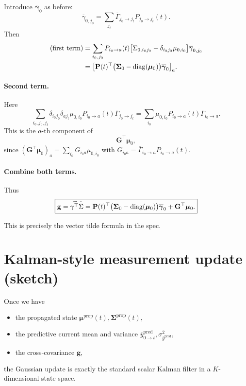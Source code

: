 \documentclass[11pt]{article}
\begin{document}
Introduce \(\overline{\boldsymbol{\gamma}}_0\) as before:
\[
  \overline{\gamma}_{0,j_0}
  =
  \sum_{j_t}
  \overline{\Gamma}_{j_0\to j_t}
  P_{j_0\to j_t}(t).
\]
Then
\begin{align*}
  \text{(first term)}
  &=
  \sum_{i_0,j_0}
  P_{i_0\to a}(t)
  \bigl[
    \Sigma_{0,i_0 j_0}
    - \delta_{i_0 j_0}\mu_{0,i_0}
  \bigr]
  \overline{\gamma}_{0,j_0}
  \\
  &=
  \bigl[
    \mathbf{P}(t)^\top
    \bigl(\boldsymbol{\Sigma}_0-\operatorname{diag}(\boldsymbol{\mu}_0)\bigr)
    \overline{\boldsymbol{\gamma}}_0
  \bigr]_a.
\end{align*}

\paragraph{Second term.}

Here
\[
  \sum_{i_0,j_0,j_t}
  \delta_{i_0 j_0}
  \delta_{a j_t}
  \mu_{0,i_0}
  P_{i_0\to a}(t)
  \overline{\Gamma}_{j_0\to j_t}
  =
  \sum_{i_0}
  \mu_{0,i_0}
  P_{i_0\to a}(t)
  \overline{\Gamma}_{i_0\to a}.
\]
This is the \(a\)-th component of
\[
  \mathbf{G}^\top\boldsymbol{\mu}_0,
\]
since
\((\mathbf{G}^\top\boldsymbol{\mu}_0)_a = \sum_{i_0}G_{i_0 a}\mu_{0,i_0}\)
with \(G_{i_0 a}=\overline{\Gamma}_{i_0\to a}P_{i_0\to a}(t)\).

\paragraph{Combine both terms.}

Thus
\[
  \boxed{
    \mathbf{g}
    =
    \widetilde{\gamma^\top\Sigma}
    =
    \mathbf{P}(t)^\top
    \bigl(\boldsymbol{\Sigma}_0-\operatorname{diag}(\boldsymbol{\mu}_0)\bigr)
    \overline{\boldsymbol{\gamma}}_0
    +
    \mathbf{G}^\top\boldsymbol{\mu}_0.
  }
\]

This is precisely the vector tilde formula in the spec.


\section{Kalman-style measurement update (sketch)}

Once we have
\begin{itemize}
  \item the propagated state
  \(\boldsymbol{\mu}^{\text{prop}}(t),\boldsymbol{\Sigma}^{\text{prop}}(t)\),
  \item the predictive current mean and variance
  \(\overline{y}^{\text{pred}}_{0\to t},\sigma^2_{\overline{y}^{\text{pred}}}\),
  \item the cross-covariance \(\mathbf{g}\),
\end{itemize}
the Gaussian update is exactly the standard scalar Kalman filter in a
\(K\)-dimensional state space.
\end{document}
